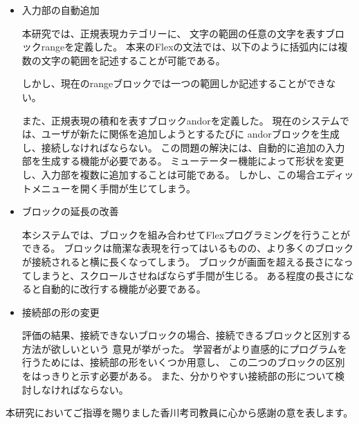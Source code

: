 \documentclass{risepaper}
\begin{document}
\begin{itemize}
\item 入力部の自動追加

本研究では、正規表現カテゴリーに、
文字の範囲の任意の文字を表すブロックrangeを定義した。
本来のFlexの文法では、以下のように括弧内には複数の文字の範囲を記述することが可能である。

\shadowbox{
\begin{minipage}[t]{4cm}
\begin{verbatim}
[a-zA-Z0-9]
\end{verbatim}
\end{minipage}
}

しかし、現在のrangeブロックでは一つの範囲しか記述することができない。

また、正規表現の積和を表すブロックandorを定義した。
現在のシステムでは、ユーザが新たに関係を追加しようとするたびに
andorブロックを生成し、接続しなければならない。
この問題の解決には、自動的に追加の入力部を生成する機能が必要である。
ミューテーター機能によって形状を変更し、入力部を複数に追加することは可能である。
しかし、この場合エディットメニューを開く手間が生じてしまう。

\end{itemize}

\begin{itemize}
\item ブロックの延長の改善

本システムでは、ブロックを組み合わせてFlexプログラミングを行うことができる。
ブロックは簡潔な表現を行ってはいるものの、より多くのブロックが接続されると横に長くなってしまう。
ブロックが画面を超える長さになってしまうと、スクロールさせねばならず手間が生じる。
ある程度の長さになると自動的に改行する機能が必要である。

\end{itemize}

\begin{itemize}
\item 接続部の形の変更

評価の結果、接続できないブロックの場合、接続できるブロックと区別する方法が欲しいという
意見が挙がった。
学習者がより直感的にプログラムを行うためには、接続部の形をいくつか用意し、
この二つのブロックの区別をはっきりと示す必要がある。
また、分かりやすい接続部の形について検討しなければならない。

\end{itemize}

\acknowledgment  %

本研究においてご指導を賜りました香川考司教員に心から感謝の意を表します。
\end{document}
